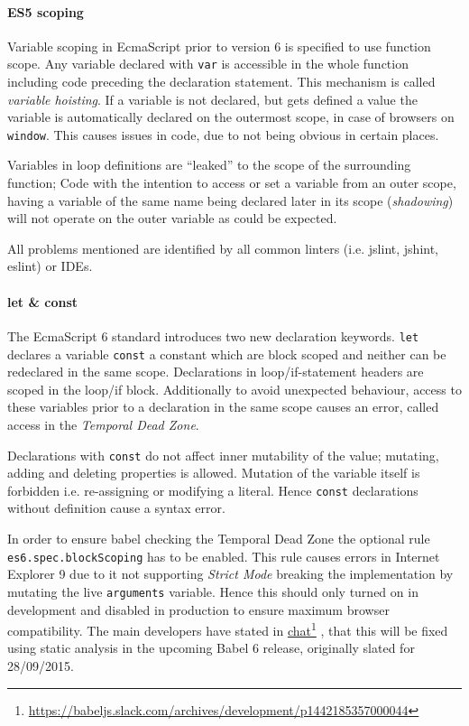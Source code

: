 \documentclass{bioinfo}
\newcommand\fnurl[2]{%
  \href{#1}{#2}\footnote{\url{#1}}%
}
\begin{document}
\paragraph{ES5 scoping\textcolon}
Variable scoping in EcmaScript prior to version 6 is specified to use function scope.
Any variable declared with {\tt var} is accessible in the whole function including
code preceding the declaration statement. This mechanism is called {\em variable hoisting}.
If a variable is not declared, but gets defined a value the variable is automatically declared
on the outermost scope, in case of browsers on {\tt window}. This causes issues in code, due
to not being obvious in certain places.

Variables in loop definitions are ``leaked'' to the scope of the surrounding function; Code
with the intention to access or set a variable from an outer scope, having a variable of
the same name being declared later in its scope ({\em shadowing}) will not operate on the
outer variable as could be expected.

All problems mentioned are identified by all common linters (i.e. jslint, jshint, eslint)
or IDEs.


\paragraph{let \& const\textcolon}
The EcmaScript 6 standard introduces two new declaration keywords. {\tt let} declares
a variable {\tt const} a constant which are block scoped and neither can be redeclared in the
same scope. Declarations in loop/if-statement headers are scoped in the loop/if block.
Additionally to avoid unexpected behaviour, access to these variables prior
to a declaration in the same scope causes an error, called access in
the {\em Temporal Dead Zone}.

Declarations with {\tt const} do not affect inner mutability of the value; mutating, adding and
deleting properties is allowed. Mutation of the variable itself is forbidden i.e. re-assigning
or modifying a literal. Hence {\tt const} declarations without definition cause a syntax error.

In order to ensure babel checking the Temporal Dead Zone the optional rule
{\tt es6.spec.blockScoping} has to be enabled. This rule causes errors in Internet Explorer 9
due to it not supporting {\sl Strict Mode} breaking the implementation by mutating the live
{\tt arguments} variable. Hence this should only turned on in development and disabled in production
to ensure maximum browser compatibility.
The main developers have stated in
\fnurl{https://babeljs.slack.com/archives/development/p1442185357000044}{chat}, that this will
be fixed using static analysis in the upcoming Babel 6 release, originally slated for 28/09/2015.
\end{document}
